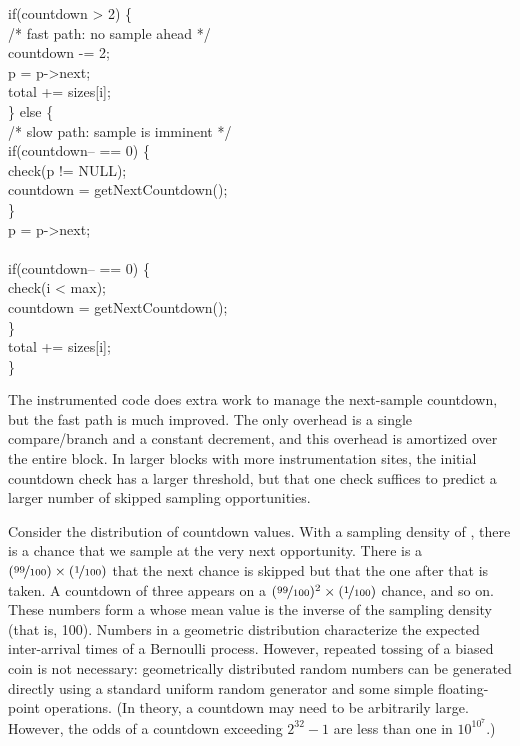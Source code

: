 \begin{code}
  if(countdown > 2) \{ \\
  \> /* fast path: no sample ahead */ \\
  \> countdown -= 2; \\
  \> \up p = p->next; \\
  \> \up total += sizes[i]; \\
  \} else \{ \\
  \> /* slow path: sample is imminent */ \\
  \> if(countdown-- == 0) \{ \\
  \>\> check(p != NULL); \\
  \>\> countdown = getNextCountdown(); \\
  \> \} \\
  \> \up p = p->next; \\
  \> \\
  \> if(countdown-- == 0) \{ \\
  \>\> check(i < max); \\
  \>\> countdown = getNextCountdown(); \\
  \> \} \\
  \> \up total += sizes[i]; \\
  \}
\end{code}

The instrumented code does extra work to manage the
next-sample countdown, but the fast path is much improved.  The only
overhead is a single compare/branch and a constant decrement, and this
overhead is amortized over the entire block.  In larger blocks with
more instrumentation sites, the initial countdown check has a larger
threshold, but that one check suffices to predict a larger number of
skipped sampling opportunities.

Consider the distribution of countdown values.  With a sampling
density of , there is a  chance that
we sample at the very next opportunity.  There is a
$(\nicefrac{99}{100}) \times (\nicefrac{1}{100})$ that the next chance
is skipped but that the one after that is taken.  A countdown of three
appears on a $(\nicefrac{99}{100})^2 \times (\nicefrac{1}{100})$
chance, and so on.  These numbers form a  whose mean value is the inverse of the sampling
density (that is, 100).  Numbers in a geometric distribution
characterize the expected inter-arrival times of a Bernoulli process.
However, repeated tossing of a biased coin is not necessary:
geometrically distributed random numbers can be generated directly
using a standard uniform random generator and some simple
floating-point operations.  (In theory, a countdown may need to
be arbitrarily large.  However, the odds of a 
countdown exceeding $2^{32}-1$ are less than one in $10^{10^7}$.)

